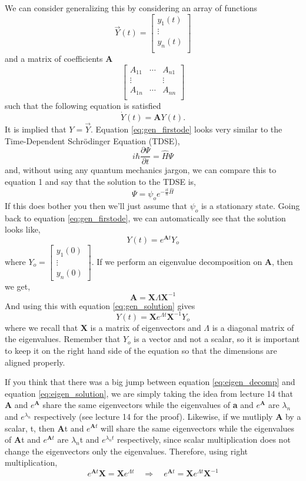 \documentclass{article}
\newcommand{\be}{\begin{equation}}
\newcommand{\ee}{\end{equation}}
\begin{document}
We can consider generalizing this by considering an array of functions
\be
  \vec{Y}(t) =
  \begin{bmatrix}
    y_1(t) \\
    \vdots \\
    y_n(t) \\
  \end{bmatrix}
\ee
and a matrix of coefficients \textbf{A}
\be
  \begin{bmatrix}
    A_{11} & \cdots & A_{n1} \\
    \vdots & & \vdots \\
    A_{1n} & \cdots & A_{nn}\\
  \end{bmatrix}
\ee
such that the following equation is satisfied
\be \label{eq:gen_firstode}
  \dot{Y}(t) = \textbf{A} Y(t) .
\ee
It is implied that $Y = \vec{Y}$.
Equation \ref{eq:gen_firstode} looks very similar to the Time-Dependent Schr\"odinger Equation (TDSE),
\be
  i \hbar \frac{\partial \Psi}{\partial t} = \hat{H} \Psi
\ee
and, without using any quantum mechanics jargon, we can compare this to equation 1 and say that the solution to the TDSE is,
\be
  \Psi = \psi_o e^{-\frac{it}{\hbar} \hat{H}}
\ee
If this does bother you then we'll just assume that $\psi_o$ is a stationary state.
Going back to equation \ref{eq:gen_firstode}, we can automatically see that the solution looks like,
\be \label{eq:gen_solution}
  Y(t) = e^{\textbf{A} t} Y_o
\ee
where $Y_o = \begin{bmatrix} y_1(0) \\ \vdots \\ y_n(0) \end{bmatrix}$.
If we perform an eigenvalue decomposition on \textbf{A}, then we get,
\be \label{eq:eigen_decomp}
  \textbf{A} = \textbf{X} \Lambda \textbf{X}^{-1}
\ee
And using this with equation \ref{eq:gen_solution} gives
\be \label{eq:eigen_solution}
  Y(t) = \textbf{X} e^{\Lambda t} \textbf{X}^{-1} Y_o
\ee
where we recall that \textbf{X} is a matrix of eigenvectors and $\Lambda$ is a diagonal matrix of the eigenvalues.
Remember that $Y_o$ is a vector and not a scalar, so it is important to keep it on the right hand side of the equation so that the dimensions are aligned properly.

If you think that there was a big jump between equation \ref{eq:eigen_decomp} and equation \ref{eq:eigen_solution}, we are simply taking the idea from lecture 14 that \textbf{A} and $e^{\textbf{A}}$ share the same eigenvectors while the eigenvalues of \textbf{a} and $e^{\textbf{A}}$ are $\lambda_n$ and $e^{\lambda_n}$ respectively (see lecture 14 for the proof).
Likewise, if we mutliply \textbf{A} by a scalar, t, then \textbf{A}t and $e^{\textbf{A} t}$ will share the same eigenvectors while the eigenvalues of \textbf{A}t and $e^{\textbf{A} t}$ are $\lambda_n$t and $e^{\lambda_n t}$ respectively, since scalar multiplication does not change the eigenvectors only the eigenvalues.
Therefore, using right multiplication,
\be
  e^{\textbf{A} t} \textbf{X} = \textbf{X} e^{\Lambda t} \quad \Rightarrow \quad e^{\textbf{A} t} = \textbf{X} e^{\Lambda t} \textbf{X}^{-1}
\ee
\end{document}
